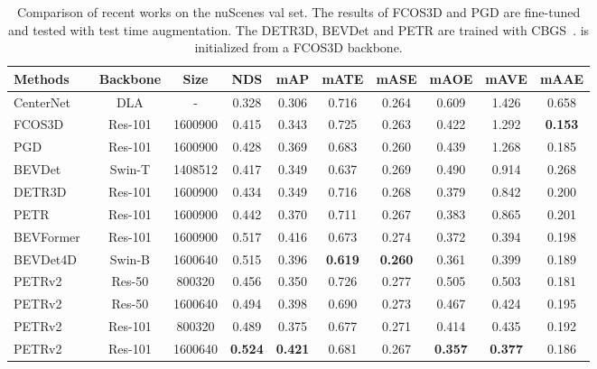 \documentclass[10pt,twocolumn,letterpaper]{article}
\begin{document}
\begin{table*}[t!]
\begin{center}
\caption{Comparison of recent works on the nuScenes val set. The results of FCOS3D and PGD are fine-tuned and tested with test time augmentation. The DETR3D, BEVDet and PETR are trained with CBGS~\cite{zhu2019class}.  is initialized from a FCOS3D backbone.
}
\label{table:1}
\begin{tabular}{l|cc|ccccccc}
\hline
Methods & Backbone & Size  & NDS & mAP & mATE & mASE & mAOE & mAVE & mAAE \\

\hline
CenterNet~\cite{zhou2019objects}&DLA  &  - &0.328 &0.306 &0.716 &0.264 &0.609 &1.426 &0.658   \\
 FCOS3D~\cite{wang2021fcos3d}  &Res-101  & 1600900  &0.415 &0.343 &0.725 &0.263 &0.422 &1.292 &\textbf{0.153} \\
 PGD~\cite{wang2022pgd} &Res-101 & 1600900  &0.428 &0.369  &0.683 &0.260 &0.439 &1.268 &0.185  \\
BEVDet~\cite{huang2021bevdet} &Swin-T & 1408512  &0.417 &0.349 &0.637 &0.269 &0.490 &0.914 &0.268 \\
DETR3D~\cite{wang2022detr3d} &Res-101  & 1600900  &0.434 &0.349 &0.716 &0.268 &0.379 &0.842 &0.200 \\
PETR~\cite{liu2022petr}  &Res-101 & 1600900 &0.442 &0.370 &0.711 &0.267 &0.383 &  0.865 & 0.201 \\
\hline
BEVFormer~\cite{li2022bevformer}  &Res-101 & 1600900 &0.517 &0.416 &0.673 &0.274 &0.372 &0.394 &0.198 \\
BEVDet4D~\cite{huang2022bevdet4d}  &Swin-B & 1600640 &0.515 &0.396 &\textbf{0.619} &\textbf{0.260} &0.361 &0.399 &0.189 \\
PETRv2 &Res-50 & 800320 &0.456 &0.350 &0.726 &0.277 &0.505 &0.503 &0.181 \\
PETRv2 &Res-50 & 1600640 &0.494 &0.398 &0.690 &0.273 &0.467 &0.424 &0.195 \\
PETRv2  &Res-101 & 800320 &0.489 &0.375 &0.677 &0.271 &0.414 &0.435 &0.192 \\
PETRv2  &Res-101 & 1600640 &\textbf{0.524} &\textbf{0.421} &0.681 &0.267 &\textbf{0.357} &\textbf{0.377} &0.186 \\
\hline
\end{tabular}
\end{center}

\end{table*}
\setlength{\tabcolsep}{1pt}
\end{document}
